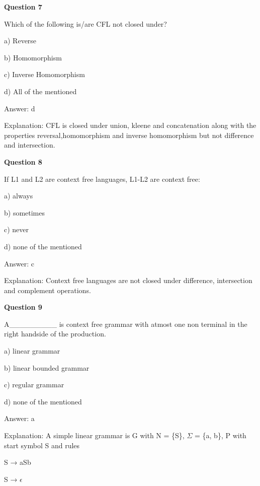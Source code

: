 \documentclass{article}
\begin{document}
\begin{mdframed}[linewidth=1pt, roundcorner=5pt, linecolor=gray!30, backgroundcolor=gray!5]
\textbf{Question 7} 

Which of the following is/are CFL not closed under?

a) Reverse

b) Homomorphism

c) Inverse Homomorphism

d) All of the mentioned
\vspace{5pt} \par
\begin{tcolorbox}[colback=green!5, colframe=green!40!black, title=Solution]
Answer: d

Explanation: CFL is closed under union, kleene and concatenation along with the properties reversal,homomorphism and inverse homomorphism but not difference and intersection.
\end{tcolorbox}
\end{mdframed}

\begin{mdframed}[linewidth=1pt, roundcorner=5pt, linecolor=gray!30, backgroundcolor=gray!5]
\textbf{Question 8} 

If L1 and L2 are context free languages, L1-L2 are context free:

a) always

b) sometimes

c) never

d) none of the mentioned
\vspace{5pt} \par
\begin{tcolorbox}[colback=green!5, colframe=green!40!black, title=Solution]
Answer: c

Explanation: Context free languages are not closed under difference, intersection and complement operations.
\end{tcolorbox}
\end{mdframed}

\begin{mdframed}[linewidth=1pt, roundcorner=5pt, linecolor=gray!30, backgroundcolor=gray!5]
\textbf{Question 9} 

A\_\_\_\_\_\_\_\_\_ is context free grammar with atmost one non terminal in the right handside of the production.

a) linear grammar

b) linear bounded grammar

c) regular grammar

d) none of the mentioned
\vspace{5pt} \par
\begin{tcolorbox}[colback=green!5, colframe=green!40!black, title=Solution]
Answer: a

Explanation: A simple linear grammar is G with N = \{S\}, $\Sigma$ = \{a, b\}, P with start symbol S and rules

S → aSb

S → $\epsilon$
\end{tcolorbox}
\end{mdframed}
\newpage
\end{document}
